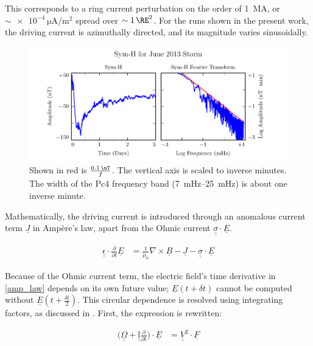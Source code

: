 \documentclass[draft,linenumbers]{agujournal}
\begin{document}
This corresponds to a ring current perturbation on the order of \SI{1}{\mega\A}, or $\sim\SI{e-4}{\uA/\m\squared}$ spread over $\sim\SI{1}{\RE}^2$. For the runs shown in the present work, the driving current is azimuthally directed, and its magnitude varies sinusoidally.

\begin{figure}
    \begin{center}
    \includegraphics[width=\textwidth]{figures/fig_symh.pdf}
    \caption{
    Shown in red is $\frac{ \SI{0.1}{\nT} }{f}$. The vertical axis is scaled to inverse minutes. The width of the Pc4 frequency band (\SIrange{7}{25}{\mHz}) is about one inverse minute.
    }
    \label{fig_symh}
    \end{center}
\end{figure}


Mathematically, the driving current is introduced through an anomalous current term $\underline{J}$ in Amp\`ere's law, apart from the Ohmic current ${\underline{\underline{\sigma}} \cdot \underline{E}}$.

\begin{linenomath*}
\begin{align}
    \label{amp_law}
    \underline{\underline{\epsilon}} \cdot \frac{\partial}{\partial t} \underline{E} &= \frac{1}{\mu_0} \nabla \times \underline{B} - \underline{J}
      - \underline{\underline{\sigma}} \cdot \underline{E}
\end{align}
\end{linenomath*}

Because of the Ohmic current term, the electric field's time derivative in \cref{amp_law} depends on its own future value; $\underline{E}(t + \delta \! t)$ cannot be computed without $\underline{E}(t + \tfrac{\delta \! t}{2})$. This circular dependence is resolved using integrating factors, as discussed in \citet{lysak_2013}. First, the expression is rewritten:
\begin{linenomath*}
\begin{align}
    \label{int_fac}
    \Big( \underline{\underline{\Omega}} + \underline{\underline{ \mathbb{I} }}\frac{\partial}{\partial t} \Big) \cdot
        \underline{E} &= \underline{\underline{V}}^2 \cdot \underline{F}
\end{align}
\end{linenomath*}
\end{document}
